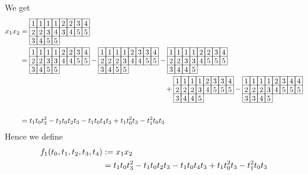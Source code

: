 We get
\begin{align*}
x_1x_2 
& = 
\begin{array}[c]{*{8}c}\cline{1-8}
\lr{1}&\lr{1}&\lr{1}&\lr{1}&\lr{2}&\lr{2}&\lr{3}&\lr{4}\\\cline{1-8}
\lr{2}&\lr{2}&\lr{3}&\lr{4}&\lr{3}&\lr{4}&\lr{5}&\lr{5}\\\cline{1-8}
\lr{3}&\lr{4}&\lr{5}&\lr{5}\\\cline{1-4}
\end{array}\\
&=\begin{array}[c]{*{8}c}\cline{1-8}
\lr{1}&\lr{1}&\lr{1}&\lr{1}&\lr{2}&\lr{2}&\lr{3}&\lr{4}\\\cline{1-8}
\lr{2}&\lr{2}&\lr{3}&\lr{3}&\lr{4}&\lr{4}&\lr{5}&\lr{5}\\\cline{1-8}
\lr{3}&\lr{4}&\lr{5}&\lr{5}\\\cline{1-4}
\end{array}
-\begin{array}[c]{*{8}c}\cline{1-8}
\lr{1}&\lr{1}&\lr{1}&\lr{1}&\lr{2}&\lr{3}&\lr{3}&\lr{4}\\\cline{1-8}
\lr{2}&\lr{2}&\lr{2}&\lr{3}&\lr{4}&\lr{4}&\lr{5}&\lr{5}\\\cline{1-8}
\lr{3}&\lr{4}&\lr{5}&\lr{5}\\\cline{1-4}
\end{array}
-\begin{array}[c]{*{8}c}\cline{1-8}
\lr{1}&\lr{1}&\lr{1}&\lr{1}&\lr{2}&\lr{2}&\lr{3}&\lr{4}\\\cline{1-8}
\lr{2}&\lr{2}&\lr{3}&\lr{3}&\lr{4}&\lr{5}&\lr{5}&\lr{5}\\\cline{1-8}
\lr{3}&\lr{4}&\lr{4}&\lr{5}\\\cline{1-4}
\end{array}\\
&\hspace{200pt}
+\begin{array}[c]{*{8}c}\cline{1-8}
\lr{1}&\lr{1}&\lr{1}&\lr{1}&\lr{2}&\lr{3}&\lr{3}&\lr{4}\\\cline{1-8}
\lr{2}&\lr{2}&\lr{2}&\lr{3}&\lr{4}&\lr{5}&\lr{5}&\lr{5}\\\cline{1-8}
\lr{3}&\lr{4}&\lr{4}&\lr{5}\\\cline{1-4}
\end{array}
-\begin{array}[c]{*{8}c}\cline{1-8}
\lr{1}&\lr{1}&\lr{1}&\lr{1}&\lr{2}&\lr{3}&\lr{4}&\lr{4}\\\cline{1-8}
\lr{2}&\lr{2}&\lr{2}&\lr{3}&\lr{4}&\lr{5}&\lr{5}&\lr{5}\\\cline{1-8}
\lr{3}&\lr{3}&\lr{4}&\lr{5}\\\cline{1-4}
\end{array}\\
& \\
&=
t_1t_0t_3^2 - t_1t_0t_2t_3 - t_1t_0t_4t_3 + t_1t_0^2t_3 - t_1^2t_0t_3
\end{align*}
Hence we define
\begin{align*}
f_1(t_0,t_1,t_2,t_3,t_4) &:= x_1x_2\\
& = t_1t_0t_3^2 - t_1t_0t_2t_3 - t_1t_0t_4t_3 + t_1t_0^2t_3 - t_1^2t_0t_3
\end{align*}

